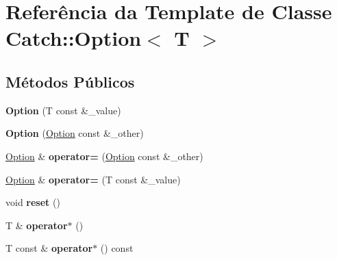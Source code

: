 \hypertarget{classCatch_1_1Option}{}\section{Referência da Template de Classe Catch\+:\+:Option$<$ T $>$}
\label{classCatch_1_1Option}
\subsection*{Métodos Públicos}
\begin{DoxyCompactItemize}
\item 
{\bfseries Option} (T const \&\+\_\+value)\hypertarget{classCatch_1_1Option_a5aeb9c22d48a6882bdf5fb4730b06c86}{}\label{classCatch_1_1Option_a5aeb9c22d48a6882bdf5fb4730b06c86}

\item 
{\bfseries Option} (\hyperlink{classCatch_1_1Option}{Option} const \&\+\_\+other)\hypertarget{classCatch_1_1Option_af02f2e4559f06384baec0def8c68c5fd}{}\label{classCatch_1_1Option_af02f2e4559f06384baec0def8c68c5fd}

\item 
\hyperlink{classCatch_1_1Option}{Option} \& {\bfseries operator=} (\hyperlink{classCatch_1_1Option}{Option} const \&\+\_\+other)\hypertarget{classCatch_1_1Option_a78c65b15dd6b2fbd04c5012c43017c8f}{}\label{classCatch_1_1Option_a78c65b15dd6b2fbd04c5012c43017c8f}

\item 
\hyperlink{classCatch_1_1Option}{Option} \& {\bfseries operator=} (T const \&\+\_\+value)\hypertarget{classCatch_1_1Option_a2be7e343ab22d6061726d32ab4622653}{}\label{classCatch_1_1Option_a2be7e343ab22d6061726d32ab4622653}

\item 
void {\bfseries reset} ()\hypertarget{classCatch_1_1Option_a37b4e0e5d4d56296adacd267a616f4e0}{}\label{classCatch_1_1Option_a37b4e0e5d4d56296adacd267a616f4e0}

\item 
T \& {\bfseries operator$\ast$} ()\hypertarget{classCatch_1_1Option_afd989852fa453731c3190dac63caccb0}{}\label{classCatch_1_1Option_afd989852fa453731c3190dac63caccb0}

\item 
T const \& {\bfseries operator$\ast$} () const \hypertarget{classCatch_1_1Option_a0f05708905dc6b0b470fb24f5d265631}{}\label{classCatch_1_1Option_a0f05708905dc6b0b470fb24f5d265631}


\end{DoxyCompactItemize}
